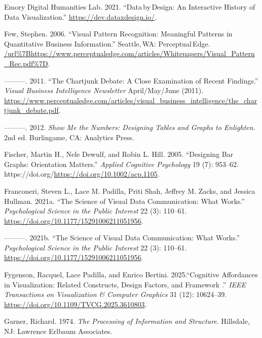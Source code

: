 \documentclass[
  letterpaper,
  DIV=11,
  numbers=noendperiod]{scrreprt}
\newlength{\cslhangindent}
\newenvironment{CSLReferences}[2] %
 {\begin{list}{}{%
  \setlength{\itemindent}{0pt}
  \setlength{\leftmargin}{0pt}
  \setlength{\parsep}{0pt}
  \ifodd #1
   \setlength{\leftmargin}{\cslhangindent}
   \setlength{\itemindent}{-1\cslhangindent}
  \fi
  \setlength{\itemsep}{#2\baselineskip}}}
 {\end{list}}
\begin{document}
\begin{CSLReferences}{1}{0}
Emory Digital Humanities Lab. 2021. {``Data\,by\,Design: An Interactive
History of Data Visualization.''} \url{https://dev.dataxdesign.io/}.

Few, Stephen. 2006. {``Visual Pattern Recognition: Meaningful Patterns
in Quantitative Business Information.''} Seattle,\,WA: Perceptual\,Edge.
\url{/url\%7Bhttps://www.perceptualedge.com/articles/Whitepapers/Visual_Pattern_Rec.pdf\%7D}.

---------. 2011. {``The Chartjunk Debate: A Close Examination of Recent
Findings.''} \emph{Visual Business Intelligence Newsletter}
April/May/June (2011).
\url{https://www.perceptualedge.com/articles/visual_business_intelligence/the_chartjunk_debate.pdf}.

---------. 2012. \emph{Show Me the Numbers: Designing Tables and Graphs
to Enlighten}. 2nd ed. Burlingame, CA: Analytics Press.

Fischer, Martin H., Nele Dewulf, and Robin L. Hill. 2005. {``Designing
Bar Graphs: Orientation Matters.''} \emph{Applied Cognitive Psychology}
19 (7): 953--62. https://doi.org/\url{https://doi.org/10.1002/acp.1105}.

Franconeri, Steven L., Lace M. Padilla, Priti Shah, Jeffrey M. Zacks,
and Jessica Hullman. 2021a. {``The Science of Visual Data Communication:
What Works.''} \emph{Psychological Science in the Public Interest} 22
(3): 110--61. \url{https://doi.org/10.1177/15291006211051956}.

---------. 2021b. {``The Science of Visual Data Communication: What
Works.''} \emph{Psychological Science in the Public Interest} 22 (3):
110--61. \url{https://doi.org/10.1177/15291006211051956}.

Fygenson, Racquel, Lace Padilla, and Enrico Bertini. 2025.{``{Cognitive
Affordances in Visualization: Related Constructs, Design Factors, and
Framework }.''} \emph{IEEE Transactions on Visualization \& Computer
Graphics} 31 (12): 10624--39.
\url{https://doi.org/10.1109/TVCG.2025.3610803}.

Garner, Richard. 1974. \emph{The Processing of Information and
Structure}. Hillsdale, NJ: Lawrence Erlbaum Associates.


\end{CSLReferences}
\end{document}
